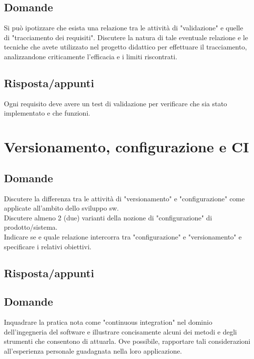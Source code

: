 \subsection*{Domande}
Si può ipotizzare che esista una relazione tra le attività di "validazione" e quelle di "tracciamento dei requisiti". Discutere la natura di tale eventuale relazione e le tecniche che avete utilizzato nel progetto didattico per effettuare il tracciamento, analizzandone criticamente l'efficacia e i limiti riscontrati.

\subsection*{Risposta/appunti}
Ogni requisito deve avere un test di validazione per verificare che sia stato implementato e che funzioni.

\section{Versionamento, configurazione e CI}

\subsection*{Domande}
Discutere la differenza tra le attività di "versionamento" e "configurazione" come applicate all'ambito dello sviluppo sw.\\

Discutere almeno 2 (due) varianti della nozione di "configurazione" di prodotto/sistema. \\

Indicare se e quale relazione intercorra tra "configurazione" e "versionamento" e specificare i relativi obiettivi.

\subsection*{Risposta/appunti}



\subsection*{Domande} %
Inquadrare la pratica nota come "continuous integration" nel dominio dell'ingegneria del software e illustrare concisamente alcuni dei metodi e degli strumenti che consentono di attuarla. Ove possibile, rapportare tali considerazioni all'esperienza personale guadagnata nella loro applicazione.

